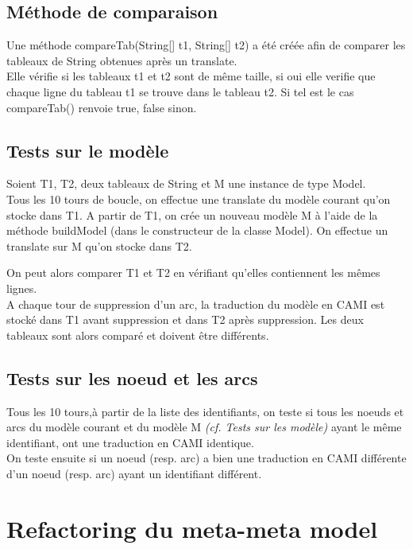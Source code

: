 \documentclass{article}
\begin{document}
\subsection{M\'ethode de comparaison}
Une m\'ethode compareTab(String[] t1, String[] t2) a \'et\'e cr\'e\'ee
afin de comparer les tableaux de String obtenues apr\`es un translate.\\

Elle v\'erifie si les tableaux t1 et t2 sont de m\^eme taille, 
si oui elle verifie que chaque ligne du tableau t1 se trouve dans le tableau t2. 
Si tel est le cas compareTab() renvoie true, false sinon.

\subsection{Tests sur le mod\`ele}
Soient T1, T2, deux tableaux de String et M une instance de type Model.\\

Tous les 10 tours de boucle, on effectue une translate du mod\`ele courant qu'on stocke dans T1.
A partir de T1, on cr\'ee un nouveau mod\`ele M \`a l'aide de la m\'ethode buildModel 
(dans le constructeur de la classe Model).
On effectue un translate sur M qu'on stocke dans T2.

On peut alors comparer T1 et T2 en v\'erifiant qu'elles contiennent les m\^emes lignes.\\

A chaque tour de suppression d'un arc, la traduction du mod\`ele en CAMI est stock\'e 
dans T1 avant suppression et dans T2 apr\`es suppression.
Les deux tableaux sont alors compar\'e et doivent \^etre diff\'erents.

\subsection{Tests sur les noeud et les arcs}
Tous les 10 tours,\`a partir de la liste des identifiants, 
on teste si tous les noeuds et arcs du mod\`ele courant et du mod\`ele M
\textit{(cf. Tests sur les mod\`ele)} ayant le m\^eme identifiant, ont une traduction en CAMI identique.\\

On teste ensuite si un noeud (resp. arc) a bien une traduction en CAMI diff\'erente
d'un noeud (resp. arc) ayant un identifiant diff\'erent.



\section{Refactoring du meta-meta model}
\end{document}
